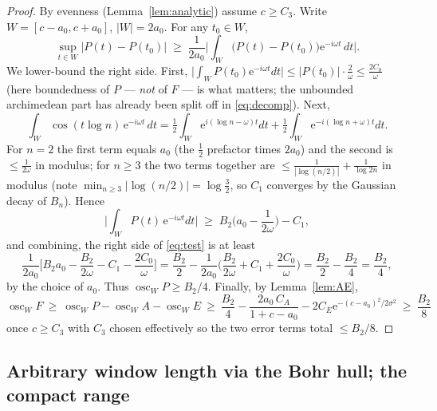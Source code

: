 \documentclass[11pt]{amsart}
\theoremstyle{definition}
\theoremstyle{remark}
\newcommand{\eE}{\mathrm{e}}
\DeclareMathOperator{\osc}{osc}
\begin{document}
\begin{proof}
By evenness (Lemma~\ref{lem:analytic}) assume $c\ge C_3$. Write $W=[c-a_0,c+a_0]$, $|W|=2a_0$. For any $t_0\in W$,
\begin{equation}\label{eq:test}
\sup_{t\in W}\big|P(t)-P(t_0)\big|\;\ge\;\frac1{2a_0}\Big|\int_W\big(P(t)-P(t_0)\big)\eE^{-i\omega t}\,dt\Big|.
\end{equation}
We lower-bound the right side. First, $\big|\int_W P(t_0)\eE^{-i\omega t}dt\big|\le|P(t_0)|\cdot\frac2\omega\le\frac{2C_0}{\omega}$ (here boundedness of $P$ --- \emph{not} of $F$ --- is what matters; the unbounded archimedean part has already been split off in \eqref{eq:decomp}). Next,
\[
\int_W\cos(t\log n)\,\eE^{-i\omega t}\,dt=\tfrac12\int_W \eE^{i(\log n-\omega)t}dt+\tfrac12\int_W \eE^{-i(\log n+\omega)t}dt .
\]
For $n=2$ the first term equals $a_0$ (the $\tfrac12$ prefactor times $2a_0$) and the second is $\le\frac1{2\omega}$ in modulus; for $n\ge3$ the two terms together are $\le\frac1{|\log(n/2)|}+\frac1{\log 2n}$ in modulus (note $\min_{n\ge3}|\log(n/2)|=\log\frac32$, so $C_1$ converges by the Gaussian decay of $B_n$). Hence
\[
\Big|\int_W P(t)\,\eE^{-i\omega t}dt\Big|\;\ge\;B_2\Big(a_0-\frac1{2\omega}\Big)-C_1 ,
\]
and combining, the right side of \eqref{eq:test} is at least
\[
\frac1{2a_0}\Big[B_2 a_0-\frac{B_2}{2\omega}-C_1-\frac{2C_0}{\omega}\Big]
=\frac{B_2}{2}-\frac1{2a_0}\Big(\frac{B_2}{2\omega}+C_1+\frac{2C_0}{\omega}\Big)
=\frac{B_2}{2}-\frac{B_2}{4}=\frac{B_2}{4},
\]
by the choice of $a_0$. Thus $\osc_W P\ge B_2/4$. Finally, by Lemma~\ref{lem:AE},
\[
\osc_W F\ \ge\ \osc_W P-\osc_W A-\osc_W E\ \ge\ \frac{B_2}4-\frac{2a_0\,C_A}{1+c-a_0}-2C_E\eE^{-(c-a_0)^2/2\sigma^2}\ \ge\ \frac{B_2}8
\]
once $c\ge C_3$ with $C_3$ chosen effectively so the two error terms total $\le B_2/8$.
\end{proof}

\subsection{Arbitrary window length via the Bohr hull; the compact range}
\end{document}
